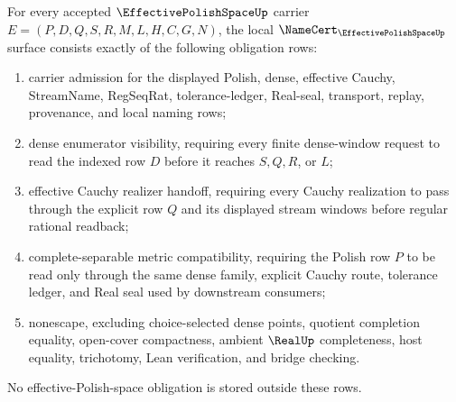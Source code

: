\begin{theorem}\label{thm:effective-polish-space-namecert-obligations}
For every accepted $\EffectivePolishSpaceUp$ carrier $E=(P,D,Q,S,R,M,L,H,C,G,N)$, the local $\NameCert_{\EffectivePolishSpaceUp}$ surface consists exactly of the following obligation rows:
\begin{enumerate}
\item carrier admission for the displayed Polish, dense, effective Cauchy, StreamName, RegSeqRat, tolerance-ledger, Real-seal, transport, replay, provenance, and local naming rows;
\item dense enumerator visibility, requiring every finite dense-window request to read the indexed row $D$ before it reaches $S,Q,R$, or $L$;
\item effective Cauchy realizer handoff, requiring every Cauchy realization to pass through the explicit row $Q$ and its displayed stream windows before regular rational readback;
\item complete-separable metric compatibility, requiring the Polish row $P$ to be read only through the same dense family, explicit Cauchy route, tolerance ledger, and Real seal used by downstream consumers;
\item nonescape, excluding choice-selected dense points, quotient completion equality, open-cover compactness, ambient $\RealUp$ completeness, host equality, trichotomy, Lean verification, and bridge checking.
\end{enumerate}
No effective-Polish-space obligation is stored outside these rows.
\end{theorem}
